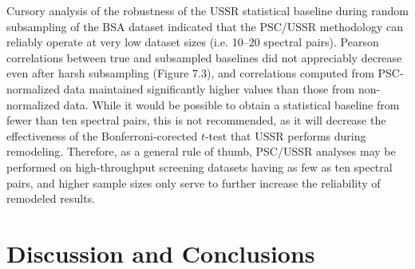 \begin{doublespace}
Cursory analysis of the robustness of the USSR statistical
baseline during random subsampling of the BSA dataset indicated that the
PSC/USSR methodology can reliably operate at very low dataset sizes
(i.e. 10--20 spectral pairs). Pearson correlations between true and subsampled
baselines did not appreciably decrease even after harsh subsampling
(Figure 7.3), and correlations computed from PSC-normalized data maintained
significantly higher values than those from non-normalized data. While it
would be possible to obtain a statistical baseline from fewer than ten spectral
pairs, this is not recommended, as it will decrease the effectiveness of the
Bonferroni-corected $t$-test that USSR performs during remodeling. Therefore,
as a general rule of thumb, PSC/USSR analyses may be performed on
high-throughput screening datasets having as few as ten spectral pairs, and
higher sample sizes only serve to further increase the reliability of remodeled
results.
\end{doublespace}

\section{Discussion and Conclusions}

